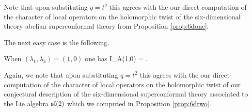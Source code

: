 Note that upon substituting $q = t^2$ this agrees with the our direct computation of the character of local operators on the holomorphic twist of the six-dimensional theory abelian superconformal theory from Proposition \ref{prop:6done}.

The next easy case is the following.
\begin{cor}
\label{cor:6dtest2}
When $(\lambda_1,\lambda_3) = (1,0)$ one has  
\beqn\label{eqn:6dtwo}
\ch \til I_A(1,0) =  .
\eeqn
\end{cor}

Again, we note that upon substituting $q = t^2$ this agrees with the our direct computation of the character of local operators on the holomorphic twist of our conjectural description of the six-dimensional superconformal theory associated to the Lie algebra $\mathfrak{sl}(2)$ which we computed in Proposition \ref{prop:6dtwo}. 



